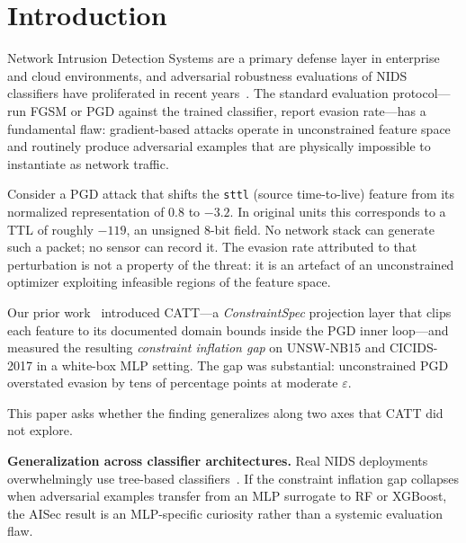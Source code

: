 \documentclass[sigconf,anonymous=true]{acmart}
\begin{document}
\maketitle

\section{Introduction}
\label{sec:intro}

Network Intrusion Detection Systems are a primary defense layer in
enterprise and cloud environments, and adversarial robustness evaluations
of NIDS classifiers have proliferated in recent years~\cite{
  apruzzese2022modeling, han2021evaluating, yang2022carefully}.
The standard evaluation protocol---run FGSM or PGD against the trained
classifier, report evasion rate---has a fundamental flaw: gradient-based
attacks operate in unconstrained feature space and routinely produce
adversarial examples that are physically impossible to instantiate as
network traffic.

Consider a PGD attack that shifts the \texttt{sttl} (source
time-to-live) feature from its normalized representation of $0.8$ to
$-3.2$.  In original units this corresponds to a TTL of roughly $-119$,
an unsigned 8-bit field.  No network stack can generate such a packet;
no sensor can record it.  The evasion rate attributed to that perturbation
is not a property of the threat: it is an artefact of an unconstrained
optimizer exploiting infeasible regions of the feature space.

Our prior work~\cite{sasso2026catt} introduced CATT---a
\emph{ConstraintSpec} projection layer that clips each feature to its
documented domain bounds inside the PGD inner loop---and measured the
resulting \emph{constraint inflation gap} on UNSW-NB15 and CICIDS-2017
in a white-box MLP setting.  The gap was substantial: unconstrained PGD
overstated evasion by tens of percentage points at moderate $\varepsilon$.

This paper asks whether the finding generalizes along two axes that
CATT did not explore.

\noindent\textbf{Generalization across classifier architectures.}
Real NIDS deployments overwhelmingly use tree-based
classifiers~\cite{he2023survey}.  If the constraint inflation gap
collapses when adversarial examples transfer from an MLP surrogate to
RF or XGBoost, the AISec result is an MLP-specific curiosity rather than
a systemic evaluation flaw.
\end{document}
